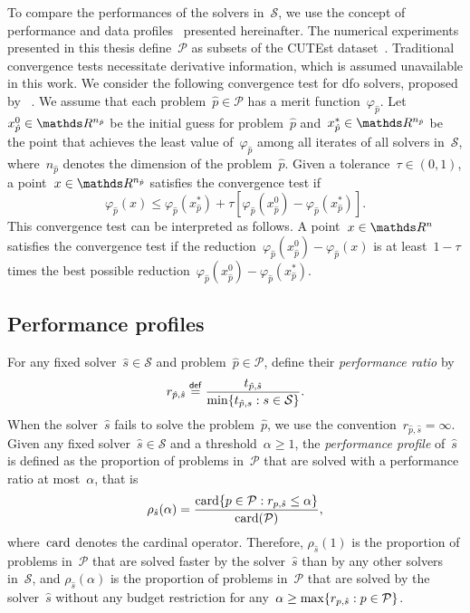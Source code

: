 To compare the performances of the solvers in~$\mathcal{S}$, we use the concept of performance and data profiles~\cite{Dolan_More_2002,More_Wild_2009} presented hereinafter.
The numerical experiments presented in this thesis define~$\mathcal{P}$ as subsets of the CUTEst dataset~\cite{Gould_Orban_Toint_2015}.
Traditional convergence tests necessitate derivative information, which is assumed unavailable in this work.
We consider the following convergence test for \gls{dfo} solvers, proposed by \citeauthor{More_Wild_2009}~\cite{More_Wild_2009}.
We assume that each problem~$\hat{p} \in \mathcal{P}$ has a merit function~$\varphi_{\hat{p}}$.
Let~$x_{\hat{p}}^0 \in \R^{n_{\hat{p}}}$ be the initial guess for problem~$\hat{p}$ and~$x_{\hat{p}}^{\ast} \in \R^{n_{\hat{p}}}$ be the point that achieves the least value of~$\varphi_{\hat{p}}$ among all iterates of all solvers in~$\mathcal{S}$, where~$n_{\hat{p}}$ denotes the dimension of the problem~$\hat{p}$.
Given a tolerance~$\tau \in (0, 1)$, a point~$x \in \R^{n_{\hat{p}}}$ satisfies the convergence test if
\begin{equation*}
    \varphi_{\hat{p}}(x) \le \varphi_{\hat{p}}(x_{\hat{p}}^{\ast}) + \tau [\varphi_{\hat{p}}(x_{\hat{p}}^0) - \varphi_{\hat{p}}(x_{\hat{p}}^{\ast})].
\end{equation*}
This convergence test can be interpreted as follows.
A point~$x \in \R^n$ satisfies the convergence test if the reduction~$\varphi_{\hat{p}}(x_{\hat{p}}^0) - \varphi_{\hat{p}}(x)$ is at least~$1 - \tau$ times the best possible reduction~$\varphi_{\hat{p}}(x_{\hat{p}}^0) - \varphi_{\hat{p}}(x_{\hat{p}}^{\ast})$.

\subsection{Performance profiles}

For any fixed solver~$\hat{s} \in \mathcal{S}$ and problem~$\hat{p} \in \mathcal{P}$, define their \emph{performance ratio} by
\begin{equation*}
    r_{\hat{p}, \hat{s}} \mathrel{\stackrel{\mathsf{def}}{=}} \frac{t_{\hat{p}, \hat{s}}}{\min \{t_{\hat{p}, s} : s \in \mathcal{S}\}}.
\end{equation*}
When the solver~$\hat{s}$ fails to solve the problem~$\hat{p}$, we use the convention~$r_{\hat{p}, \hat{s}} = \infty$.
Given any fixed solver~$\hat{s} \in \mathcal{S}$ and a threshold~$\alpha \ge 1$, the \emph{performance profile} of~$\hat{s}$ is defined as the proportion of problems in~$\mathcal{P}$ that are solved with a performance ratio at most~$\alpha$, that is
\begin{equation*}
    \rho_{\hat{s}}(\alpha) = \frac{\operatorname{card} \{p \in \mathcal{P} : r_{p, \hat{s}} \le \alpha\}}{\operatorname{card}(\mathcal{P})},
\end{equation*}
where~$\operatorname{card}$ denotes the cardinal operator.
Therefore, $\rho_{\hat{s}}(1)$ is the proportion of problems in~$\mathcal{P}$ that are solved faster by the solver~$\hat{s}$ than by any other solvers in~$\mathcal{S}$, and $\rho_{\hat{s}}(\alpha)$ is the proportion of problems in~$\mathcal{P}$ that are solved by the solver~$\hat{s}$ without any budget restriction for any~$\alpha \ge \max \{r_{p, \hat{s}} : p \in \mathcal{P}\}$.

